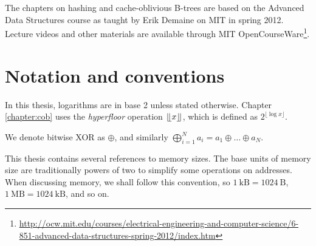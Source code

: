 The chapters on hashing and cache-oblivious B-trees are based on the Advanced
Data Structures course as taught by Erik Demaine on MIT in spring 2012.
Lecture videos and other materials are available through MIT OpenCourseWare\footnote{%
\url{http://ocw.mit.edu/courses/electrical-engineering-and-computer-science/6-851-advanced-data-structures-spring-2012/index.htm}}.

\section*{Notation and conventions}
In this thesis, logarithms are in base 2 unless stated otherwise.
Chapter \ref{chapter:cob} uses the \emph{hyperfloor} operation
$\lfloor \kern -0.22em \lfloor x\rfloor \kern -0.22em \rfloor$, which is defined as $2^{\lfloor\log x\rfloor}$.

We denote bitwise XOR as $\oplus$, and similarly $\bigoplus_{i=1}^N
a_i=a_1\oplus\ldots\oplus a_N$.

This thesis contains several references to memory sizes. The base units of
memory size are traditionally powers of two to simplify some operations on
addresses.
When discussing memory, we shall follow this convention, so
$1\ \mathrm{kB}=1024\ \mathrm{B}$, $1\ \mathrm{MB}=1024\ \mathrm{kB}$,
and so on.
